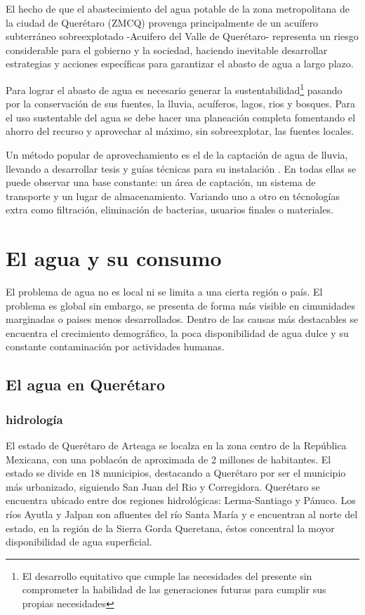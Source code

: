 \documentclass[letterpaper,12pt,oneside]{book}
\begin{document}
    El hecho de que el abastecimiento del agua potable de la zona metropolitana de la ciudad de Querétaro (ZMCQ) provenga principalmente de un acuífero subterráneo sobreexplotado -Acuifero del Valle de Querétaro- representa un riesgo considerable para el gobierno y la sociedad, haciendo inevitable desarrollar estrategias y acciones específicas para garantizar el abasto de agua a largo plazo.

    Para lograr el abasto de agua es necesario generar la sustentabilidad\footnote{El desarrollo equitativo que cumple las necesidades del presente sin comprometer la habilidad de las generaciones futuras para cumplir sus propias necesidades} pasando por la conservación de sus fuentes, la lluvia, acuíferos, lagos, rios y bosques. Para el uso sustentable del agua se debe hacer una planeación completa fomentando el ahorro del recurso y aprovechar al máximo, sin sobreexplotar, las fuentes locales.

    Un método popular de aprovechamiento es el de la captación de agua de lluvia, llevando a desarrollar tesis \cite{comision2016lineamientos} \cite{hugues2019captacion} \cite{nickisch2018sistemas} \cite{van2013captacion} y guías técnicas para su instalación \cite{queralt2011agua} \cite{unatsabar2004guia}. En todas ellas se puede observar una base constante: un área de captación, un sistema de transporte y un lugar de almacenamiento. Variando uno a otro en técnologías extra como filtración, eliminación de bacterias, usuarios finales o materiales.


\chapter{El agua y su consumo}
    El problema de agua no es local ni se limita a una cierta región o país. El problema es global sin embargo, se presenta de forma más visible en cimunidades marginadas o paises menos desarrollados. Dentro de las causas más destacables se encuentra el crecimiento demográfico, la poca disponibilidad de agua dulce y su constante contaminación por actividades humanas.
    \section{El agua en Querétaro}
        \subsection{hidrología}
            El estado de Querétaro de Arteaga se localza en la zona centro de la República Mexicana, con una poblacón de aproximada de 2 millones de habitantes. El estado se divide en 18 municipios, destacando a Querétaro por ser el municipio más urbanizado, siguiendo San Juan del Rio y Corregidora.
            Querétaro se encuentra ubicado entre dos regiones hidrológicas: Lerma-Santiago y Pánuco. Los ríos Ayutla y Jalpan son afluentes del río Santa María y e encuentran al norte del estado, en la región de la Sierra Gorda Queretana, éstos concentral la moyor disponibilidad de agua superficial.
\end{document}
